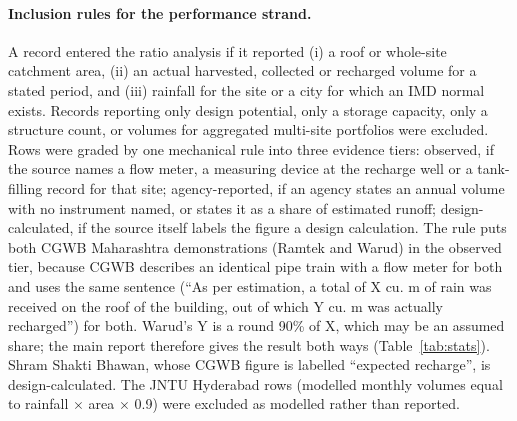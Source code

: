 \paragraph{Inclusion rules for the performance strand.} A record entered the ratio analysis if it reported (i) a roof or whole-site catchment area, (ii) an actual harvested, collected or recharged volume for a stated period, and (iii) rainfall for the site or a city for which an IMD normal exists. Records reporting only design potential, only a storage capacity, only a structure count, or volumes for aggregated multi-site portfolios were excluded. Rows were graded by one mechanical rule into three evidence tiers: observed, if the source names a flow meter, a measuring device at the recharge well or a tank-filling record for that site; agency-reported, if an agency states an annual volume with no instrument named, or states it as a share of estimated runoff; design-calculated, if the source itself labels the figure a design calculation. The rule puts both CGWB Maharashtra demonstrations (Ramtek and Warud) in the observed tier, because CGWB describes an identical pipe train with a flow meter for both and uses the same sentence (``As per estimation, a total of X cu. m of rain was received on the roof of the building, out of which Y cu. m was actually recharged'') for both. Warud's Y is a round 90\% of X, which may be an assumed share; the main report therefore gives the result both ways (Table~\ref{tab:stats}). Shram Shakti Bhawan, whose CGWB figure is labelled ``expected recharge'', is design-calculated. The JNTU Hyderabad rows (modelled monthly volumes equal to rainfall $\times$ area $\times$ 0.9) were excluded as modelled rather than reported.

